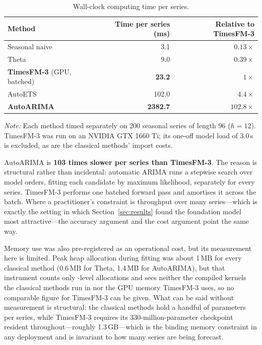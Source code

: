 \documentclass[article]{ajs}
\providecommand{\sectionref}[1]{Section~\ref{#1}}
\begin{document}
\begin{table}[!htbp]
\centering
\begin{threeparttable}
\caption{Wall-clock computing time per series.}
\label{tab:timing}
\begin{tabular}{lrr}
\toprule
Method & Time per series (ms) & Relative to TimesFM-3 \\
\midrule
Seasonal naive & 3.1 & $0.13\times$ \\
Theta & 9.0 & $0.39\times$ \\
\textbf{TimesFM-3} (GPU, batched) & \textbf{23.2} & $1\times$ \\
AutoETS & 102.0 & $4.4\times$ \\
\textbf{AutoARIMA} & \textbf{2382.7} & $\mathbf{102.8\times}$ \\
\bottomrule
\end{tabular}
\begin{tablenotes}[flushleft]\footnotesize
\item \textit{Note:} Each method timed separately on 200 seasonal series of length 96
($h = 12$). TimesFM-3 was run on an NVIDIA GTX 1660 Ti; its one-off model load of 3.0\,s is
excluded, as are the classical methods' import costs.
\end{tablenotes}
\end{threeparttable}
\end{table}

AutoARIMA is \textbf{103 times slower per series than TimesFM-3}. The reason is structural
rather than incidental: automatic ARIMA runs a stepwise search over model orders, fitting each
candidate by maximum likelihood, separately for every series. TimesFM-3 performs one batched
forward pass and amortises it across the batch. Where a practitioner's constraint is throughput
over many series---which is exactly the setting in which \sectionref{sec:results} found the
foundation model most attractive---the accuracy argument and the cost argument point the same
way.

Memory use was also pre-registered as an operational cost, but its measurement here is limited. Peak  heap allocation during fitting was about 1\,MB
for every classical method (0.6\,MB for Theta, 1.4\,MB for AutoARIMA), but that instrument counts
only -level allocations and sees neither the compiled  kernels the
classical methods run in nor the GPU memory TimesFM-3 uses, so no comparable figure for TimesFM-3
can be given. What can be said without measurement is structural: the classical methods hold a
handful of parameters per series, while TimesFM-3 requires its 330-million-parameter checkpoint
resident throughout---roughly 1.3\,GB---which is the binding memory constraint in any deployment
and is invariant to how many series are being forecast.
\end{document}
